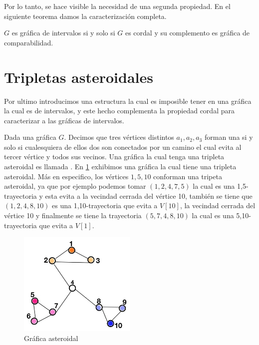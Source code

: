 Por lo tanto, se hace visible la necesidad de una segunda propiedad. En el
siguiente teorema damos la caracterización completa.

\begin{teorema}
\label{teo:Crctzn1}
    $G$ es gráfica de intervalos si y solo si $G$ es cordal y su complemento es
    gráfica de comparabilidad.
\end{teorema}

\section{Tripletas asteroidales}
\label{sec:AstTrpls}
Por ultimo introducimos una estructura la cual es imposible tener en una gráfica
la cual es de intervalos, y este hecho complementa la propiedad cordal para
caracterizar a las gráficas de intervalos.

Dada una gráfica $G$. Decimos que tres vértices distintos $a_1,a_2,a_3$ forman
una  si y solo si cualesquiera de ellos dos son
conectados por un camino el cual evita al tercer vértice y todos sus vecinos.
Una gráfica la cual tenga una tripleta asteroidal es llamada
. En \cref{fig:GrafAstrdl} exhibimos una gráfica
la cual tiene una tripleta asteroidal. Más en especifico, los vértices $1,5,10$
conforman una tripeta asteroidal, ya que por ejemplo podemos tomar $(1,2,4,7,5)$
la cual es una 1,5-trayectoria y esta evita a la vecindad cerrada del vértice
10, también se tiene que $(1,2,4,8,10)$ es una 1,10-trayectoria que evita a
$V[10]$, la vecindad cerrada del vértice 10 y finalmente se tiene la trayectoria
$(5,7,4,8,10)$ la cual es una 5,10-trayectoria que evita a $V[1]$.

\begin{figure}[H]
  \centering
  \includegraphics[width=0.5\textwidth]{recursos/capturas/Ast-Trpl.jpg}
  \caption{Gráfica asteroidal}
  \label{fig:GrafAstrdl}
\end{figure}

